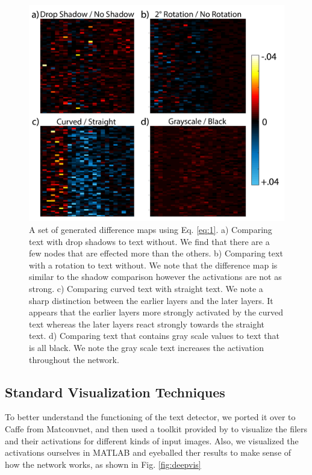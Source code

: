 \documentclass[10pt,twocolumn,letterpaper]{article}
\begin{document}
\begin{figure}
\includegraphics[width=\columnwidth]{Figures/diff_examples/diff_examples-01.png}
\caption{A set of generated difference maps using Eq. \ref{eq:1}. a) Comparing text with drop shadows to text without. We find that there are a few nodes that are effected more than the others. b) Comparing text with a rotation to text without. We note that the difference map is similar to the shadow comparison however the activations are not as strong. c) Comparing curved text with straight text. We note a sharp distinction between the earlier layers and the later layers. It appears that the earlier layers more strongly activated by the curved text whereas the later layers react strongly towards the straight text. d) Comparing text that contains gray scale values to text that is all black. We note the gray scale text increases the activation throughout the network.}
\label{fig:diffexamples}
\end{figure}

\subsection{Standard Visualization Techniques}
To better understand the functioning of the text detector, we ported it over to Caffe from Matconvnet, and then used a toolkit provided by \cite{yosinski2015understanding} to visualize the filers and their activations for different kinds of input images. Also, we visualized the activations ourselves in MATLAB and eyeballed ther results to make sense of how the network works, as shown in Fig. \ref{fig:deepvis}
\end{document}
